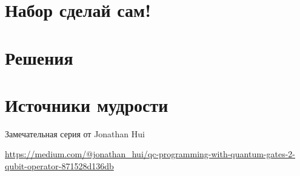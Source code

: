 \documentclass[12pt]{article}
\newcounter{problem}[section]
\theoremstyle{definition}
\begin{document}

\renewenvironment{solution}[1]{%
         \vskip .5cm plus 2cm minus 0.1cm%
         {\bfseries \hyperlink{problem:#1}{#1.}}%
}%
{%
}%

\section{Набор сделай сам!}

\cite{stay2014deutch}

\section{Решения}



\section{Источники мудрости}

Замечательная серия от Jonathan Hui

\url{https://medium.com/@jonathan_hui/qc-programming-with-quantum-gates-2-qubit-operator-871528d136db}

\printbibliography[heading=none]
\end{document}
